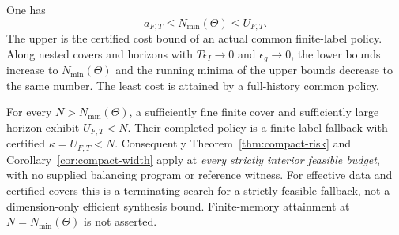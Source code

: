 \begin{theorem}\label{thm:compact-cost}
One has
\[
 a_{F,T}\le N_{\min}(\Theta)\le U_{F,T}.
\]
The upper is the certified cost bound of an actual common finite-label policy. Along nested covers and horizons with $T\epsilon_I\to0$ and $\epsilon_g\to0$, the lower bounds increase to $N_{\min}(\Theta)$ and the running minima of the upper bounds decrease to the same number. The least cost is attained by a full-history common policy.

For every $N>N_{\min}(\Theta)$, a sufficiently fine finite cover and sufficiently large horizon exhibit $U_{F,T}<N$. Their completed policy is a finite-label fallback with certified $\kappa=U_{F,T}<N$. Consequently Theorem~\ref{thm:compact-risk} and Corollary~\ref{cor:compact-width} apply at \emph{every strictly interior feasible budget}, with no supplied balancing program or reference witness. For effective data and certified covers this is a terminating search for a strictly feasible fallback, not a dimension-only efficient synthesis bound. Finite-memory attainment at $N=N_{\min}(\Theta)$ is not asserted.
\end{theorem}
